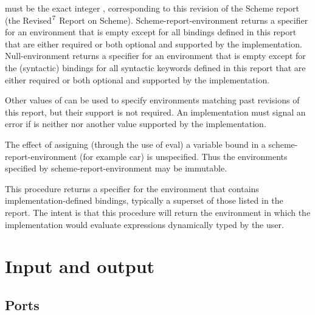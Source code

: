 \begin{entry}{%
}

 must be the exact integer {\cf \integerversion},
corresponding to this revision of the Scheme report (the
Revised$^7$ Report on Scheme).
{\cf Scheme-report-environment} returns a specifier for an
environment that is empty except for all bindings defined in
this report that are either required or both optional and
supported by the implementation. {\cf Null-environment} returns
a specifier for an environment that is empty except for the
(syntactic) bindings for all syntactic keywords defined in
this report that are either required or both optional and
supported by the implementation.

Other values of  can be used to specify environments
matching past revisions of this report, but their support is not
required.  An implementation must signal an error if 
is neither {\cf \integerversion} nor another value supported by
the implementation.

The effect of assigning (through the use of {\cf eval}) a variable
bound in a {\cf scheme-report-environment}
(for example {\cf car}) is unspecified.  Thus the environments specified
by {\cf scheme-report-environment} may be immutable.

\end{entry}

\begin{entry}{%
}

This procedure returns a specifier for the environment that
contains imple\-men\-ta\-tion-defined bindings, typically a superset of
those listed in the report.  The intent is that this procedure
will return the environment in which the implementation would evaluate
expressions dynamically typed by the user.

\end{entry}

\section{Input and output}

\subsection{Ports}
\label{portsection}

